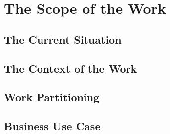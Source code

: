 \chapter{The Scope of the Work}

\section{The Current Situation}

\section{The Context of the Work}

\section{Work Partitioning}

\section{Business Use Case}

